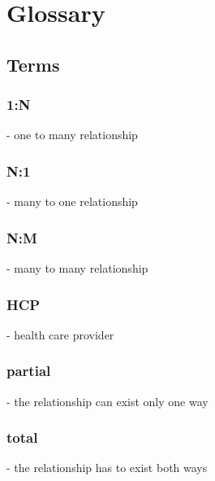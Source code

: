 \chapter{Glossary}

\section{Terms}
\subsection{1:N}- one to many relationship
\subsection{N:1}- many to one relationship
\subsection{N:M}- many to many relationship
\subsection{HCP}- health care provider
\subsection{partial}- the relationship can exist only one way
\subsection{total}- the relationship has to exist both ways